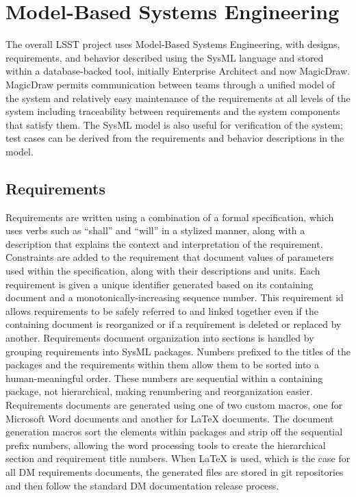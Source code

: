 \section{Model-Based Systems Engineering}

The overall LSST project uses Model-Based Systems Engineering\cite{2014SPIE.9150E..0MC}, with designs, requirements, and behavior described using the SysML language and stored within a database-backed tool, initially Enterprise Architect and now MagicDraw.
MagicDraw permits communication between teams through a unified model of the system and
relatively easy maintenance of the requirements at all levels of the system including traceability between requirements and the system components that satisfy them.
The SysML model is also useful for verification of the system; test cases can be derived from the requirements and behavior descriptions in the model.

\subsection{Requirements}

Requirements are written using a combination of a formal specification, which uses verbs such as ``shall'' and ``will'' in a stylized manner, along with a description that explains the context and interpretation of the requirement.
Constraints are added to the requirement that document values of parameters used within the specification, along with their descriptions and units.
Each requirement is given a unique identifier generated based on its containing document and a monotonically-increasing sequence number.
This requirement id allows requirements to be safely referred to and linked together even if the containing document is reorganized or if a requirement is deleted or replaced by another.
Requirements document organization into sections is handled by grouping requirements into SysML packages.
Numbers prefixed to the titles of the packages and the requirements within them allow them to be sorted into a human-meaningful order.
These numbers are sequential within a containing package, not hierarchical, making renumbering and reorganization easier.
Requirements documents are generated using one of two custom macros, one for Microsoft Word documents and another for LaTeX documents.
The document generation macros sort the elements within packages and strip off the sequential prefix numbers, allowing the word processing tools to create the hierarchical section and requirement title numbers.
When LaTeX is used, which is the case for all DM requirements documents, the generated files are stored in git repositories and then follow the standard DM documentation release process.

